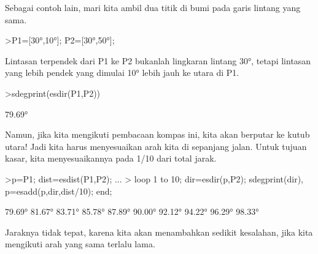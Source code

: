 \documentclass[a4paper,10pt]{article}
\begin{document}
\begin{eulernotebook}
\begin{eulercomment}
\begin{eulercomment}
\begin{eulercomment}
\begin{eulercomment}
\begin{eulercomment}
\begin{eulercomment}
\begin{eulercomment}
\begin{eulercomment}
\begin{eulercomment}
\begin{eulercomment}
\begin{eulercomment}
\begin{eulercomment}
\begin{eulercomment}
\begin{eulercomment}
\begin{eulercomment}
\begin{eulercomment}
\begin{eulercomment}
\begin{eulercomment}
\begin{eulercomment}
\begin{eulercomment}
\begin{eulercomment}
\begin{eulercomment}
\begin{eulercomment}
\begin{eulercomment}
\begin{eulercomment}
\begin{eulercomment}
\begin{eulercomment}
\begin{eulercomment}
\begin{eulercomment}
\begin{eulercomment}
\begin{eulercomment}
\begin{eulercomment}
\begin{eulercomment}
\begin{eulercomment}
\begin{eulercomment}
Sebagai contoh lain, mari kita ambil dua titik di bumi pada garis
lintang yang sama.
\end{eulercomment}
\begin{eulerprompt}
>P1=[30°,10°]; P2=[30°,50°];
\end{eulerprompt}
\begin{eulercomment}
Lintasan terpendek dari P1 ke P2 bukanlah lingkaran lintang 30°,
tetapi lintasan yang lebih pendek yang dimulai 10° lebih jauh ke utara
di P1.
\end{eulercomment}
\begin{eulerprompt}
>sdegprint(esdir(P1,P2))
\end{eulerprompt}
\begin{euleroutput}
       79.69°
\end{euleroutput}
\begin{eulercomment}
Namun, jika kita mengikuti pembacaan kompas ini, kita akan berputar ke
kutub utara! Jadi kita harus menyesuaikan arah kita di sepanjang
jalan. Untuk tujuan kasar, kita menyesuaikannya pada 1/10 dari total
jarak.
\end{eulercomment}
\begin{eulerprompt}
>p=P1;  dist=esdist(P1,P2); ...
>  loop 1 to 10; dir=esdir(p,P2); sdegprint(dir), p=esadd(p,dir,dist/10); end;
\end{eulerprompt}
\begin{euleroutput}
       79.69°
       81.67°
       83.71°
       85.78°
       87.89°
       90.00°
       92.12°
       94.22°
       96.29°
       98.33°
\end{euleroutput}
\begin{eulercomment}
Jaraknya tidak tepat, karena kita akan menambahkan sedikit kesalahan,
jika kita mengikuti arah yang sama terlalu lama.
\end{eulercomment}
\begin{eulerprompt}

\end{eulerprompt}
\end{eulercomment}
\end{eulercomment}
\end{eulercomment}
\end{eulercomment}
\end{eulercomment}
\end{eulercomment}
\end{eulercomment}
\end{eulercomment}
\end{eulercomment}
\end{eulercomment}
\end{eulercomment}
\end{eulercomment}
\end{eulercomment}
\end{eulercomment}
\end{eulercomment}
\end{eulercomment}
\end{eulercomment}
\end{eulercomment}
\end{eulercomment}
\end{eulercomment}
\end{eulercomment}
\end{eulercomment}
\end{eulercomment}
\end{eulercomment}
\end{eulercomment}
\end{eulercomment}
\end{eulercomment}
\end{eulercomment}
\end{eulercomment}
\end{eulercomment}
\end{eulercomment}
\end{eulercomment}
\end{eulercomment}
\end{eulercomment}
\end{eulernotebook}
\end{document}
